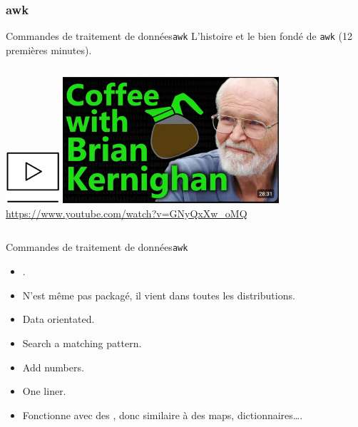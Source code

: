 \documentclass{beamer}
\begin{document}
    \subsubsection{awk}\label{subsubsec:awk}
    \begin{frame}{Commandes de traitement de données}{\lstinline{awk}}
        L'histoire et le bien fondé de \lstinline{awk} (12 premières minutes).
        \bigbreak
        \begin{columns}
            \centering
            \includegraphics[width=2cm]{image/video}
            \includegraphics[width=8cm]{image/coffee-with-bk} \\ \url{https://www.youtube.com/watch?v=GNyQxXw_oMQ} \\
        \end{columns}
    \end{frame}

    \begin{frame}{Commandes de traitement de données}{\lstinline{awk}}
        \begin{itemize}
            \item {}.
            \item N'est même pas packagé, il vient dans toutes les distributions.
            \item Data orientated.
            \item Search a matching pattern.
            \item Add numbers.
            \item One liner.
            \item Fonctionne avec des , donc similaire à des maps, dictionnaires\ldots.
        \end{itemize}
    \end{frame}
\end{document}
